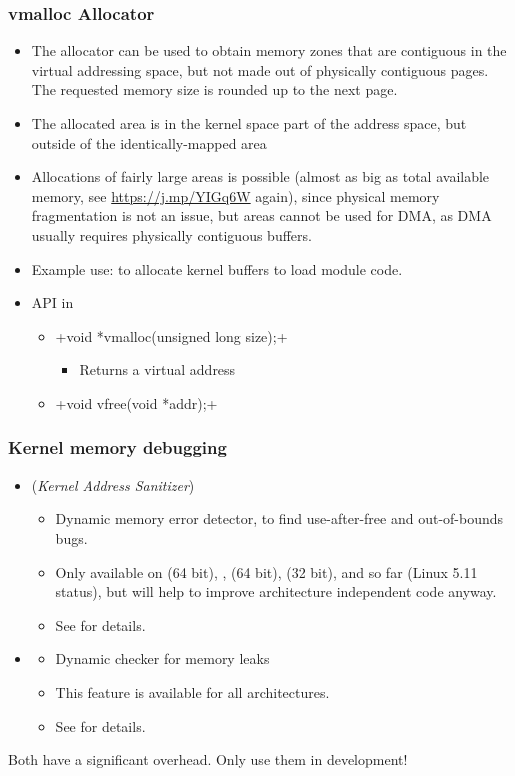 \begin{frame}[fragile]
  \frametitle{vmalloc Allocator}
  \begin{itemize}
  \item The  allocator can be used to obtain
    memory zones that are contiguous in the virtual addressing space,
    but not made out of physically contiguous pages. The
    requested memory size is rounded up to the next page.
  \item The allocated area is in the kernel space part of the address
    space, but outside of the identically-mapped area
  \item Allocations of fairly large areas is possible (almost as big
    as total available memory, see \url{https://j.mp/YIGq6W} again),
    since physical memory fragmentation is not an issue, but areas
    cannot be used for DMA, as DMA usually requires physically
    contiguous buffers.
  \item Example use: to allocate kernel buffers to load module code.
  \item API in 
    \begin{itemize}
    \item {}+void *vmalloc(unsigned long size);+
      \begin{itemize}
      \item Returns a virtual address
      \end{itemize}
    \item {}+void vfree(void *addr);+
    \end{itemize}
  \end{itemize}
\end{frame}

\begin{frame}
  \frametitle{Kernel memory debugging}
  \begin{itemize}
  \item {} ({\em Kernel Address Sanitizer})
    \begin{itemize}
    \item Dynamic memory error detector, to find use-after-free and
      out-of-bounds bugs.
    \item Only available on  (64 bit), , 
      (64 bit),  (32 bit),  and  so far
      (Linux 5.11 status), but will help to improve architecture independent
      code anyway.
    \item See  for details.
    \end{itemize}
  \item {}
    \begin{itemize}
    \item Dynamic checker for memory leaks
    \item This feature is available for all architectures.
    \item See  for details.
    \end{itemize}
  \end{itemize}
  Both have a significant overhead. Only use them in development!
\end{frame}

